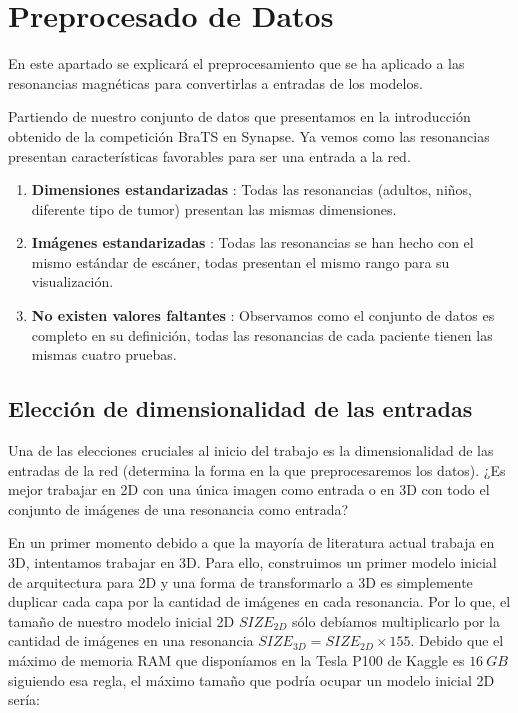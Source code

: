 \section{Preprocesado de Datos}

En este apartado se explicará el preprocesamiento que se ha aplicado a las resonancias magnéticas para convertirlas a entradas de los modelos. 

Partiendo de nuestro conjunto de datos que presentamos en la introducción obtenido de la competición BraTS en Synapse. Ya vemos como las resonancias presentan características favorables para ser una entrada a la red.

\begin{enumerate}
	\item \textbf{Dimensiones estandarizadas} : Todas las resonancias (adultos, niños, diferente tipo de tumor) presentan las mismas dimensiones.
	\item \textbf{Imágenes estandarizadas} : Todas las resonancias se han hecho con el mismo estándar de escáner, todas presentan el mismo rango para su visualización. 
	\item \textbf{No existen valores faltantes} : Observamos como el conjunto de datos es completo en su definición, todas las resonancias de cada paciente tienen las mismas cuatro pruebas.
\end{enumerate}

\subsection{Elección de dimensionalidad de las entradas}

Una de las elecciones cruciales al inicio del trabajo es la dimensionalidad de las entradas de la red (determina la forma en la que preprocesaremos los datos). ¿Es mejor trabajar en 2D con una única imagen como entrada o en 3D con todo el conjunto de imágenes de una resonancia como entrada?

En un primer momento debido a que la mayoría de literatura actual trabaja en 3D, intentamos trabajar en 3D. Para ello, construimos un primer modelo inicial de arquitectura para 2D y  una forma de transformarlo a 3D es simplemente duplicar cada capa por la cantidad de imágenes en cada resonancia. Por lo que, el tamaño de nuestro modelo inicial 2D $SIZE_{2D}$ sólo debíamos multiplicarlo por la cantidad de imágenes en una resonancia $SIZE_{3D} = SIZE_{2D} \times 155 $. Debido que el máximo de memoria RAM que disponíamos en la Tesla P100 de Kaggle es $16\ GB$ siguiendo esa regla, el máximo tamaño que podría ocupar un modelo inicial 2D sería: 

